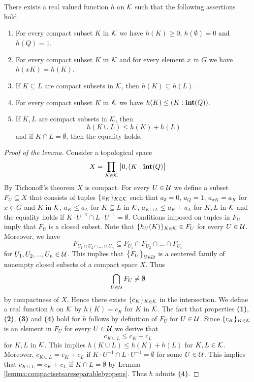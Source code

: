 \begin{lemma}\label{lemma:definitiononcompactsets}
There exists a real valued function $h$ on ${\mathcal K}$ such that the following assertions hold.
\begin{enumerate}[label=\emph{\textbf{(\arabic*)}}, leftmargin=3.0em]
\item For every compact subset $K$ in ${\mathcal K}$ we have $h(K)\geq 0$, $h(\emptyset) = 0$ and $h(Q)=1$.
\item For every compact subset $K$ in ${\mathcal K}$ and for every element $x$ in $G$ we have $h(xK) = h(K)$.
\item If $K\subseteq L$ are compact subsets in ${\mathcal K}$, then $h(K)\subseteq h(L)$.
\item For every compact subset $K$ in ${\mathcal K}$ we have $h(K) \leq \left(K:\mathbf{int}(Q)\right)$.
\item If $K, L$ are compact subsets in ${\mathcal K}$, then
$$h(K\cup L) \leq h(K) + h(L)$$
and if $K \cap L = \emptyset$, then the equality holds.
\end{enumerate}
\end{lemma}
\begin{proof}[Proof of the lemma]
Consider a topological space
$$X = \prod_{K\in {\mathcal K}}\big[0,(K:\mathbf{int}(Q)\big]$$
By Tichonoff's theorem $X$ is compact. For every $U\in {\mathcal U}$ we define a subset $F_U\subseteq X$ that consists of tuples $\{a_K\}_{K\in {\mathcal K}}$ such that $a_{\emptyset} = 0$, $a_{Q}=1$, $a_{xK}= a_K$ for $x\in G$ and $K$ in ${\mathcal K}$, $a_K\leq a_L$ for $K\subseteq L$ in ${\mathcal K}$, $a_{K\cup L}\leq a_K + a_L$ for $K,L$ in ${\mathcal K}$ and the equality holds if $K\cdot U^{-1} \cap L\cdot U^{-1} = \emptyset$. Conditions imposed on tuples in $F_U$ imply that $F_U$ is a closed subset. Note that $\{h_U(K)\}_{K\in {\mathcal K}}\in F_U$ for every $U\in {\mathcal U}$. Moreover, we have
$$F_{U_1\cap U_2\cap ...\cap U_n} \subseteq F_{U_1}\cap F_{U_2}\cap ...\cap F_{U_n}$$
for $U_1, U_2,...,U_n\in {\mathcal U}$. This implies that $\big\{F_U\big\}_{U\in {\mathcal U}}$ is a centered family of nonempty closed subsets of a compact space $X$. Thus
$$\bigcap_{U\in {\mathcal U}}F_U \neq \emptyset$$
by compactness of $X$. Hence there exists $\{c_K\}_{K\in {\mathcal K}}$ in the intersection. We define a real function $h$ on ${\mathcal K}$ by $h(K) = c_K$ for $K$ in ${\mathcal K}$. The fact that properties \textbf{(1)}, \textbf{(2)}, \textbf{(3)} and \textbf{(4)} hold for $h$ follows by definition of $F_U$ for $U\in {\mathcal U}$. Since $\{c_K\}_{K\in {\mathcal K}}$ is an element in $F_U$ for every $U\in {\mathcal U}$ we derive that
$$c_{K\cup L} \leq c_K+c_L$$
for $K, L$ in ${\mathcal K}$. This implies $h(K\cup L) \leq h(K) + h(L)$ for $K, L\in {\mathcal K}$. Moreover, $c_{K\cup L} = c_K + c_L$ if $K\cdot U^{-1}\cap L\cdot U^{-1} = \emptyset$ for some $U\in {\mathcal U}$. This implies that $c_{K\cup L} = c_K + c_L$ if $K \cap L = \emptyset$ by Lemma \ref{lemma:compactsetsareseparablebyopens}. Thus $h$ admits \textbf{(4)}.
\end{proof}

